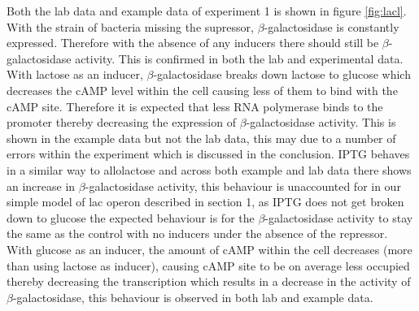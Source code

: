 \documentclass{article}
\begin{document}
Both the lab data and example data of experiment 1 is shown in figure \ref{fig:lacl}. With the strain of bacteria missing the supressor, $\beta$-galactosidase is constantly expressed. Therefore with the absence of any inducers there should still be $\beta$-galactosidase activity. This is confirmed in both the lab and experimental data. With lactose as an inducer, $\beta$-galactosidase breaks down lactose to glucose which decreases the cAMP level within the cell causing less of them to bind with the cAMP site. Therefore it is expected that less RNA polymerase binds to the promoter thereby decreasing the expression of $\beta$-galactosidase activity. This is shown in the example data but not the lab data, this may due to a number of errors within the experiment which is discussed in the conclusion. IPTG behaves in a similar way to allolactose and across both example and lab data there shows an increase in $\beta$-galactosidase activity, this behaviour is unaccounted for in our simple model of lac operon described in section 1, as IPTG does not get broken down to glucose the expected behaviour is for the $\beta$-galactosidase activity to stay the same as the control with no inducers under the absence of the repressor. With glucose as an inducer, the amount of cAMP within the cell decreases (more than using lactose as inducer), causing cAMP site to be on average less occupied thereby decreasing the transcription which results in a decrease in the activity of $\beta$-galactosidase, this behaviour is observed in both lab and example data.


\end{document}
